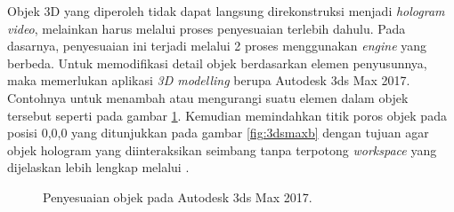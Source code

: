 		Objek 3D yang diperoleh tidak dapat langsung direkonstruksi menjadi \textit{hologram video}, melainkan harus melalui proses penyesuaian terlebih dahulu. Pada dasarnya, penyesuaian ini terjadi melalui 2 proses menggunakan \textit{engine} yang berbeda. Untuk memodifikasi detail objek berdasarkan elemen penyusunnya, maka memerlukan aplikasi \textit{3D modelling} berupa Autodesk 3ds Max 2017. Contohnya untuk menambah atau mengurangi suatu elemen dalam objek tersebut seperti pada gambar \ref{fig:3dsmax}. Kemudian memindahkan titik poros objek pada posisi 0,0,0 yang ditunjukkan pada gambar \ref{fig:3dsmaxb} dengan tujuan agar objek hologram yang diinteraksikan seimbang tanpa terpotong \textit{workspace} yang dijelaskan lebih lengkap melalui .
		\vspace{-2ex}
		\begin{figure} [H]
			\hspace{0.1em}
			\caption{Penyesuaian objek pada Autodesk 3ds Max 2017.}
			\label{fig:3dsmax}
		\end{figure}
		\vspace{-2ex}
		
